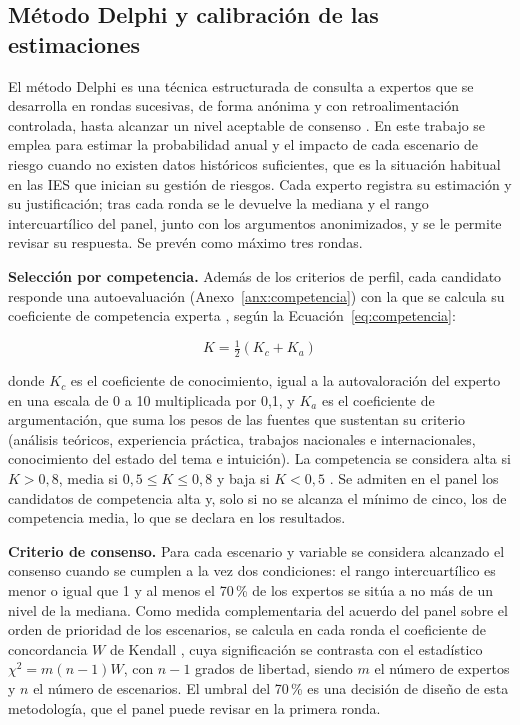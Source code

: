 \subsection{Método Delphi y calibración de las estimaciones}

El método Delphi es una técnica estructurada de consulta a expertos que se desarrolla en rondas sucesivas, de forma anónima y con retroalimentación controlada, hasta alcanzar un nivel aceptable de consenso \cite{okoli2004delphi}. En este trabajo se emplea para estimar la probabilidad anual y el impacto de cada escenario de riesgo cuando no existen datos históricos suficientes, que es la situación habitual en las IES que inician su gestión de riesgos. Cada experto registra su estimación y su justificación; tras cada ronda se le devuelve la mediana y el rango intercuartílico del panel, junto con los argumentos anonimizados, y se le permite revisar su respuesta. Se prevén como máximo tres rondas.

\textbf{Selección por competencia.} Además de los criterios de perfil, cada candidato responde una autoevaluación (Anexo~\ref{anx:competencia}) con la que se calcula su coeficiente de competencia experta \cite{cabero2013competencia}, según la Ecuación~\ref{eq:competencia}:

\begin{equation}
\label{eq:competencia}
K = \tfrac{1}{2}\left(K_c + K_a\right)
\end{equation}

\noindent donde $K_c$ es el coeficiente de conocimiento, igual a la autovaloración del experto en una escala de 0 a 10 multiplicada por 0,1, y $K_a$ es el coeficiente de argumentación, que suma los pesos de las fuentes que sustentan su criterio (análisis teóricos, experiencia práctica, trabajos nacionales e internacionales, conocimiento del estado del tema e intuición). La competencia se considera alta si $K > 0{,}8$, media si $0{,}5 \le K \le 0{,}8$ y baja si $K < 0{,}5$ \cite{cabero2013competencia}. Se admiten en el panel los candidatos de competencia alta y, solo si no se alcanza el mínimo de cinco, los de competencia media, lo que se declara en los resultados.

\textbf{Criterio de consenso.} Para cada escenario y variable se considera alcanzado el consenso cuando se cumplen a la vez dos condiciones: el rango intercuartílico es menor o igual que 1 y al menos el 70\,\% de los expertos se sitúa a no más de un nivel de la mediana. Como medida complementaria del acuerdo del panel sobre el orden de prioridad de los escenarios, se calcula en cada ronda el coeficiente de concordancia $W$ de Kendall \cite{kendall1939rankings}, cuya significación se contrasta con el estadístico $\chi^2 = m(n-1)W$, con $n-1$ grados de libertad, siendo $m$ el número de expertos y $n$ el número de escenarios. El umbral del 70\,\% es una decisión de diseño de esta metodología, que el panel puede revisar en la primera ronda.

